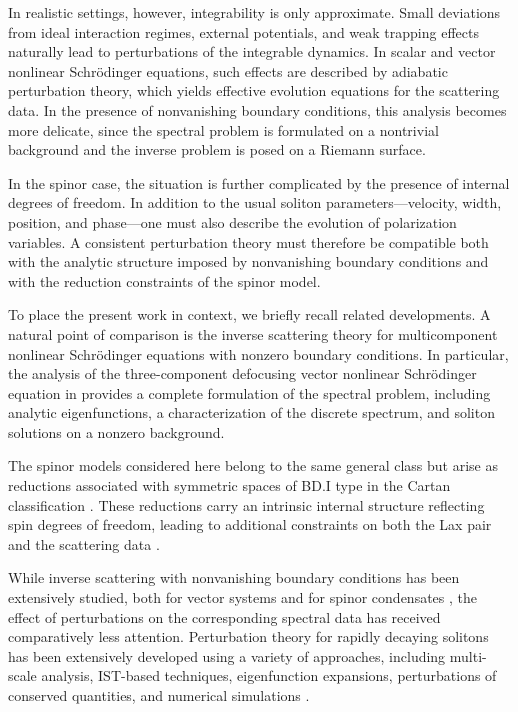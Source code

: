 \documentclass[11pt]{amsart}
\theoremstyle{definition}
\numberwithin{equation}{section}
\begin{document}
In realistic settings, however, integrability is only approximate. Small deviations from ideal interaction regimes, external potentials, and weak trapping effects naturally lead to perturbations of the integrable dynamics. In scalar and vector nonlinear Schr\"odinger equations, such effects are described by adiabatic perturbation theory, which yields effective evolution equations for the scattering data. In the presence of nonvanishing boundary conditions, this analysis becomes more delicate, since the spectral problem is formulated on a nontrivial background and the inverse problem is posed on a Riemann surface.

In the spinor case, the situation is further complicated by the presence of internal degrees of freedom. In addition to the usual soliton parameters—velocity, width, position, and phase—one must also describe the evolution of polarization variables. A consistent perturbation theory must therefore be compatible both with the analytic structure imposed by nonvanishing boundary conditions and with the reduction constraints of the spinor model.

To place the present work in context, we briefly recall related developments. A natural point of comparison is the inverse scattering theory for multicomponent nonlinear Schr\"odinger equations with nonzero boundary conditions. In particular, the analysis of the three-component defocusing vector nonlinear Schr\"odinger equation in \cite{BiondiniKrausPrinari2016} provides a complete formulation of the spectral problem, including analytic eigenfunctions, a characterization of the discrete spectrum, and soliton solutions on a nonzero background.

The spinor models considered here belong to the same general class but arise as reductions associated with symmetric spaces of BD.I type in the Cartan classification \cite{GerdjikovKostovValchev2009}. These reductions carry an intrinsic internal structure reflecting spin degrees of freedom, leading to additional constraints on both the Lax pair and the scattering data \cite{TsuchidaWadati1998}.

While inverse scattering with nonvanishing boundary conditions has been extensively studied, both for vector systems \cite{BiondiniKrausPrinari2016} and for spinor condensates \cite{DoktorovRothosKivshar2007}, the effect of perturbations on the corresponding spectral data has received comparatively less attention. Perturbation theory for rapidly decaying solitons has been extensively developed using a variety of approaches, including multi-scale analysis, IST-based techniques, eigenfunction expansions, perturbations of conserved quantities, and numerical simulations \cite{AblowitzPrinariTrubatch2004,FaddeevTakhtajan1987,NovikovEtAl1984,Whitham1999,Yang2010}. 
\end{document}
